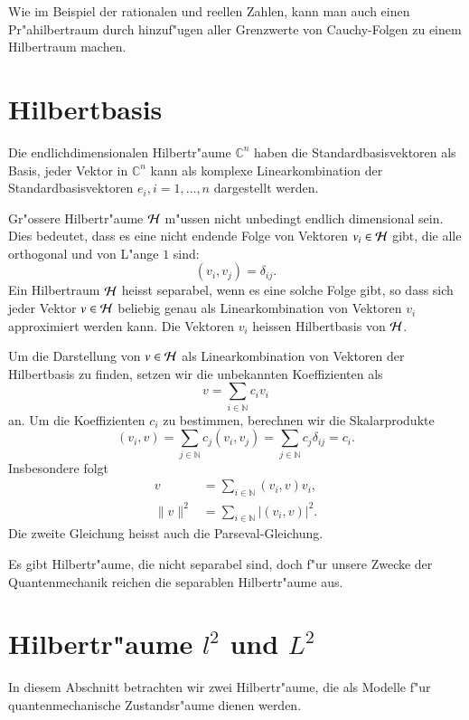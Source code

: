 Wie im Beispiel der rationalen und reellen Zahlen,
kann man auch einen Pr"ahilbertraum durch hinzuf"ugen aller Grenzwerte
von Cauchy-Folgen zu einem Hilbertraum machen.

\section{Hilbertbasis}
Die endlichdimensionalen Hilbertr"aume $\mathbb C^n$ haben die
Standardbasisvektoren als Basis, jeder Vektor in $\mathbb C^n$
kann als komplexe Linearkombination der Standardbasisvektoren
$e_i,i=1,\dots,n$ dargestellt werden.

Gr"ossere Hilbertr"aume $\cal H$ m"ussen nicht unbedingt endlich dimensional
sein. Dies bedeutet, dass es eine nicht endende Folge von Vektoren
$v_i\in\cal H$ gibt, die alle orthogonal und von L"ange $1$ sind:
\[
(v_i,v_j)=\delta_{ij}.
\]
Ein Hilbertraum $\cal H$ heisst separabel, wenn es eine solche Folge
gibt, so dass sich jeder Vektor $v\in\cal H$ beliebig genau als
Linearkombination von Vektoren $v_i$ approximiert werden kann.
Die Vektoren $v_i$ heissen Hilbertbasis von $\cal H$.

Um die Darstellung von $v\in\cal H$ als Linearkombination von Vektoren
der Hilbertbasis zu finden, setzen wir die unbekannten Koeffizienten
als 
\[
v=\sum_{i\in\mathbb N}c_iv_i
\]
an. Um die Koeffizienten $c_i$ zu bestimmen, berechnen wir die
Skalarprodukte
\[
(v_i,v)
=\sum_{j\in\mathbb N} c_j(v_i,v_j)=\sum_{j\in\mathbb N}c_j\delta_{ij}=c_i.
\]
Insbesondere folgt
\begin{align*}
v&=\sum_{i\in\mathbb N}(v_i,v) v_i,\\
\| v\|^2&=\sum_{i\in\mathbb N} |(v_i,v)|^2.
\end{align*}
Die zweite Gleichung heisst auch die Parseval-Gleichung.

Es gibt Hilbertr"aume, die nicht separabel sind, doch f"ur unsere Zwecke
der Quantenmechanik reichen die separablen Hilbertr"aume aus.

%
%
\section{Hilbertr"aume $l^2$ und $L^2$}
In diesem Abschnitt betrachten wir zwei Hilbertr"aume, die als 
Modelle f"ur quantenmechanische Zustandsr"aume dienen werden.


